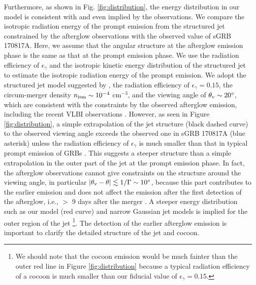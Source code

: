 \documentclass{emulateapj}
\begin{document}
Furthermore, as shown in Fig. \ref{fig:distribution},
the energy distribution in our model is consistent with and even implied by the observations. 
We compare the isotropic radiation energy of the prompt emission from the structured jet 
constrained by the afterglow observations with the observed value of sGRB 170817A. 
Here, we assume that the angular structure at the afterglow emission phase is 
the same as that at the prompt emission phase. 
We use the radiation efficiency of $\epsilon_{\gamma}$ and 
the isotropic kinetic energy distribution of the structured jet
to estimate the isotropic radiation energy of the prompt emission. 
We adopt the structured jet model suggested by \citet{2018arXiv180502870A} 
\citep[see also ][]{2018ApJ...856L..18M,2018arXiv180409345X},
the radiation efficiency of $\epsilon_{\gamma}=0.15$, the circum-merger density
$n_{\rm ism}\sim10^{-4}$ cm$^{-3}$, and the viewing angle of $\theta_{\rm v}\sim20^{\circ}$,
which are consistent with the constraints by the observed afterglow emission, 
including the recent VLBI observations \citep{2018arXiv180609693M,2018arXiv180800469G}.
However, as seen in Figure \ref{fig:distribution}, 
a simple extrapolation of the jet structure (black dashed curve) to the observed 
viewing angle exceeds the observed one in sGRB 170817A (blue asterisk)
unless the radiation efficiency of $\epsilon_{\gamma}$ is much smaller than that 
in typical prompt emission of GRBs \citep[e.g., ][]{2001ApJ...547..922F,2016MNRAS.461...51B}.
This suggests a steeper structure than a simple extrapolation in the outer part of the jet
at the prompt emission phase. 
In fact, the afterglow observations cannot give constraints on the structure around the viewing angle, 
in particular $|\theta_{\rm v}-\theta|\lesssim1/\Gamma\sim10^\circ$, 
because this part contributes to the earlier emission and 
does not affect the emission after the first detection of the afterglow, 
i.e., $>$ 9 days after the merger
\citep[e.g., ][]{2017Natur.551...71T}. 
A steeper energy distribution such as our model (red curve) and narrow Gaussian jet models
\citep{2018ApJ...853L...4R,2018arXiv180102669L,2018MNRAS.478L..18T}
is implied for the outer region of the jet 
\footnote{We should note that the cocoon emission would be much fainter than the outer red line in Figure \ref{fig:distribution}
  because a typical radiation efficiency of a cocoon is much smaller than our fiducial value of $\epsilon_{\gamma}=0.15$.}. 
The detection of the earlier afterglow emission is important to clarify the detailed structure of the jet and cocoon. 
\end{document}
